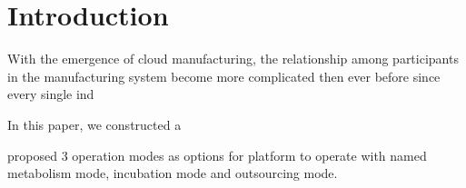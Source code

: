 \section{Introduction}
With the emergence of cloud manufacturing, the relationship among participants in the manufacturing system become more complicated then ever before since every single ind

In this paper, we constructed a 

proposed 3 operation modes as options for platform to operate with named metabolism mode, incubation mode and outsourcing mode.